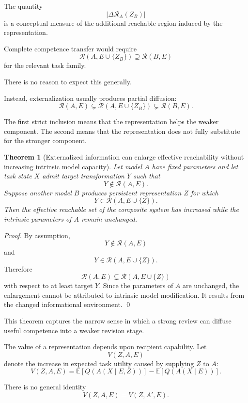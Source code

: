 \documentclass[11pt]{article}
\newtheorem{theorem}[definition]{Theorem}
\begin{document}
The quantity
\[
    |\Delta\mathcal{R}_A(Z_B)|
\]
is a conceptual measure of the additional reachable region induced by the representation.

Complete competence transfer would require
\[
    \mathcal{R}(A,E\cup\{Z_B\})
    \supseteq
    \mathcal{R}(B,E)
\]
for the relevant task family.

There is no reason to expect this generally.

Instead, externalization usually produces partial diffusion:
\[
    \mathcal{R}(A,E)
    \subsetneq
    \mathcal{R}(A,E\cup\{Z_B\})
    \subsetneq
    \mathcal{R}(B,E).
\]

The first strict inclusion means that the representation helps the weaker component. The second means that the representation does not fully substitute for the stronger component.

\begin{theorem}[Externalized information can enlarge effective reachability without increasing intrinsic model capacity]
Let model \(A\) have fixed parameters and let task state \(X\) admit target transformation \(Y\) such that
\[
    Y\notin\mathcal{R}(A,E).
\]
Suppose another model \(B\) produces persistent representation \(Z\) for which
\[
    Y\in\mathcal{R}(A,E\cup\{Z\}).
\]
Then the effective reachable set of the composite system has increased while the intrinsic parameters of \(A\) remain unchanged.
\end{theorem}

\begin{proof}
By assumption,
\[
    Y\notin\mathcal{R}(A,E)
\]
and
\[
    Y\in\mathcal{R}(A,E\cup\{Z\}).
\]
Therefore
\[
    \mathcal{R}(A,E)
    \subsetneq
    \mathcal{R}(A,E\cup\{Z\})
\]
with respect to at least target \(Y\). Since the parameters of \(A\) are unchanged, the enlargement cannot be attributed to intrinsic model modification. It results from the changed informational environment. \qed
\end{proof}

This theorem captures the narrow sense in which a strong review can diffuse useful competence into a weaker revision stage.

The value of a representation depends upon recipient capability. Let
\[
    V(Z,A,E)
\]
denote the increase in expected task utility caused by supplying \(Z\) to \(A\):
\[
    V(Z,A,E)
    =
    \mathbb{E}
    [
        Q(A(X\mid E,Z))
    ]
    -
    \mathbb{E}
    [
        Q(A(X\mid E))
    ].
\]

There is no general identity
\[
    V(Z,A,E)=V(Z,A',E).
\]
\end{document}
